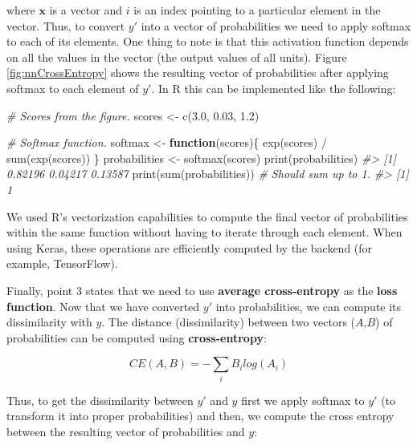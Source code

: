 \documentclass[
  11pt,
]{krantz}
\newenvironment{Shaded}{\begin{snugshade}}{\end{snugshade}}
\newcommand{\CommentTok}[1]{\textcolor[rgb]{0.37,0.37,0.37}{\textit{#1}}}
\newcommand{\ControlFlowTok}[1]{\textcolor[rgb]{0.27,0.27,0.27}{\textbf{#1}}}
\newcommand{\FloatTok}[1]{\textcolor[rgb]{0.06,0.06,0.06}{#1}}
\newcommand{\FunctionTok}[1]{\textcolor[rgb]{0,0,0}{#1}}
\newcommand{\NormalTok}[1]{#1}
\newcommand{\OtherTok}[1]{\textcolor[rgb]{0.37,0.37,0.37}{#1}}
\newcommand{\SpecialCharTok}[1]{\textcolor[rgb]{0,0,0}{#1}}
\begin{document}
where \(\boldsymbol{x}\) is a vector and \(i\) is an index pointing to a particular element in the vector. Thus, to convert \(y'\) into a vector of probabilities we need to apply softmax to each of its elements. One thing to note is that this activation function depends on all the values in the vector (the output values of all units). Figure \ref{fig:nnCrossEntropy} shows the resulting vector of probabilities after applying softmax to each element of \(y'\). In R this can be implemented like the following:

\begin{Shaded}
\begin{Highlighting}[]
\CommentTok{\# Scores from the figure.}
\NormalTok{scores }\OtherTok{\textless{}{-}} \FunctionTok{c}\NormalTok{(}\FloatTok{3.0}\NormalTok{, }\FloatTok{0.03}\NormalTok{, }\FloatTok{1.2}\NormalTok{)}

\CommentTok{\# Softmax function.}
\NormalTok{softmax }\OtherTok{\textless{}{-}} \ControlFlowTok{function}\NormalTok{(scores)\{}
  \FunctionTok{exp}\NormalTok{(scores) }\SpecialCharTok{/} \FunctionTok{sum}\NormalTok{(}\FunctionTok{exp}\NormalTok{(scores))}
\NormalTok{\}}
\NormalTok{probabilities }\OtherTok{\textless{}{-}} \FunctionTok{softmax}\NormalTok{(scores)}
\FunctionTok{print}\NormalTok{(probabilities)}
\CommentTok{\#\textgreater{} [1] 0.82196 0.04217 0.13587}
\FunctionTok{print}\NormalTok{(}\FunctionTok{sum}\NormalTok{(probabilities)) }\CommentTok{\# Should sum up to 1.}
\CommentTok{\#\textgreater{} [1] 1}
\end{Highlighting}
\end{Shaded}

We used R's vectorization capabilities to compute the final vector of probabilities within the same function without having to iterate through each element. When using Keras, these operations are efficiently computed by the backend (for example, TensorFlow).

Finally, point \(3\) states that we need to use \textbf{average cross-entropy} as the \textbf{loss function}. Now that we have converted \(y'\) into probabilities, we can compute its dissimilarity with \(y\). The distance (dissimilarity) between two vectors (\(A\),\(B\)) of probabilities can be computed using \textbf{cross-entropy}:

\begin{equation}
  CE(A,B) = - \sum_{i}{B_i log(A_i)}
  \label{eq:crossentropy}
\end{equation}

Thus, to get the dissimilarity between \(y'\) and \(y\) first we apply softmax to \(y'\) (to transform it into proper probabilities) and then, we compute the cross entropy between the resulting vector of probabilities and \(y\):
\end{document}
